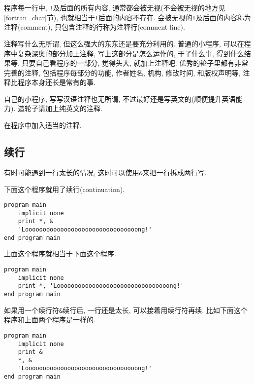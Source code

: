 程序每一行中, \texttt{!}及后面的所有内容, 通常都会被无视(不会被无视的地方见\ref{fortran_char}节), 也就相当于\texttt{!}后面的内容不存在. 会被无视的\texttt{!}及后面的内容称为注释(comment), 只包含注释的行称为注释行(comment line).

注释写什么无所谓, 但这么强大的东东还是要充分利用的. 普通的小程序, 可以在程序中复杂深奥的部分加上注释, 写上这部分是怎么运作的, 干了什么事, 得到什么结果等. 只要自己看程序的一部分, 觉得头大, 就加上注释吧. 优秀的轮子里都有非常完善的注释, 包括程序每部分的功能, 作者姓名, 机构, 修改时间, 和版权声明等, 注释比程序本身还长是常有的事.

自己的小程序, 写写汉语注释也无所谓, 不过最好还是写英文的(顺便提升英语能力). 造轮子请加上纯英文的注释.

\begin{convention}
    在程序中加入适当的注释.
\end{convention}

\subsection{续行}

有时可能遇到一行太长的情况, 这时可以使用\texttt{\&{}}来把一行拆成两行写.

下面这个程序就用了续行(continuation).
\begin{lstlisting}
program main
    implicit none
    print *, &
    'Loooooooooooooooooooooooooooooooong!'
end program main
\end{lstlisting}
上面这个程序就相当于下面这个程序.
\begin{lstlisting}
program main
    implicit none
    print *, 'Loooooooooooooooooooooooooooooooong!'
end program main
\end{lstlisting}

如果用一个续行符\texttt{\&{}}续行后, 一行还是太长, 可以接着用续行符再续. 比如下面这个程序和上面两个程序是一样的.
\begin{lstlisting}
program main
    implicit none
    print &
    *, &
    'Loooooooooooooooooooooooooooooooong!'
end program main
\end{lstlisting}

